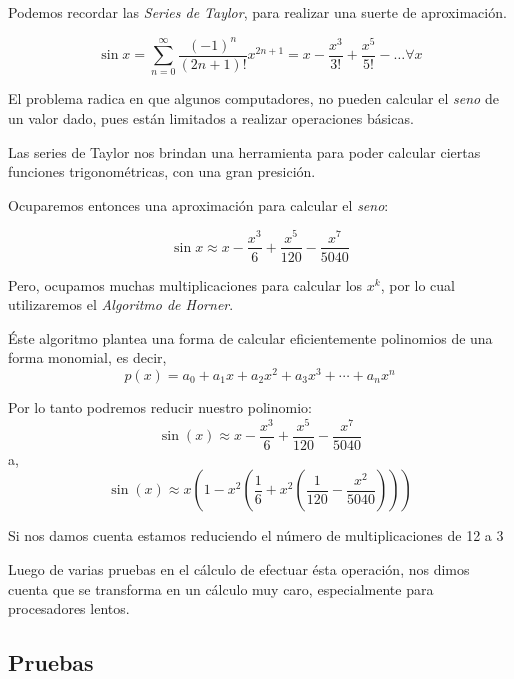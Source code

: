 Podemos recordar las \emph{Series de Taylor}, para realizar una suerte de aproximación.

$$\sin{x} = \sum^{\infty}_{n=0} \frac{(-1)^n}{(2n+1)!} x^{2n+1} = x - \frac{x^3}{3!} + \frac{x^5}{5!} - \ldots \forall x$$

El problema radica en que algunos computadores, no pueden calcular el \emph{seno} de un valor dado,
pues están limitados a realizar operaciones básicas.

Las series de Taylor nos brindan una herramienta para poder calcular ciertas funciones trigonométricas,
con una gran presición.

Ocuparemos entonces una aproximación para calcular el \emph{seno}:

$$\sin{x} \approx x - \frac{x^3}{6} + \frac{x^5}{120} - \frac{x^7}{5040}$$

Pero, ocupamos muchas multiplicaciones para calcular los $x^k$,
por lo cual utilizaremos el \emph{Algoritmo de Horner}.

Éste algoritmo plantea una forma de calcular eficientemente polinomios de una forma monomial,
es decir,
$$ p(x) = a_0 + a_1 x + a_2 x^2 + a_3 x^3 + \cdots + a_n x^n $$

Por lo tanto podremos reducir nuestro polinomio:
$$\operatorname{sin}(x) \approx x - \frac{x^3}{6} + \frac{x^5}{120} - \frac{x^7}{5040}$$
		a,
$$\operatorname{sin}(x) \approx x \left( 1 - x^{2}\left(\frac{1}{6} + x^{2}\left(\frac{1}{120} - \frac{x^2}{5040}\right)\right)\right)$$

Si nos damos cuenta estamos reduciendo el número de multiplicaciones de 12 a 3

Luego de varias pruebas en el cálculo de efectuar ésta operación,
nos dimos cuenta que se transforma en un cálculo muy caro,
especialmente para procesadores lentos.

\subsection{Pruebas}

